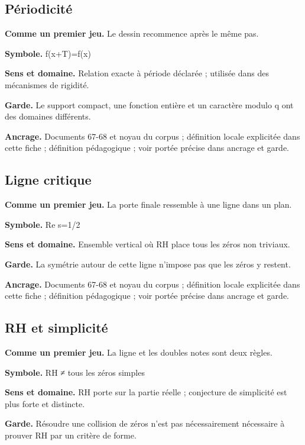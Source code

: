 \documentclass[
  9pt,
  a4paper,
]{article}
\begin{document}
\hypertarget{puxe9riodicituxe9}{%
\subsection{Périodicité}\label{puxe9riodicituxe9}}

\textbf{Comme un premier jeu.} Le dessin recommence après le même pas.

\textbf{Symbole.} f(x+T)=f(x)

\textbf{Sens et domaine.} Relation exacte à période déclarée ; utilisée
dans des mécanismes de rigidité.

\textbf{Garde.} Le support compact, une fonction entière et un caractère
modulo q ont des domaines différents.

\textbf{Ancrage.} Documents 67-68 et noyau du corpus ; définition locale
explicitée dans cette fiche ; définition pédagogique ; voir portée
précise dans ancrage et garde.

\hypertarget{ligne-critique}{%
\subsection{Ligne critique}\label{ligne-critique}}

\textbf{Comme un premier jeu.} La porte finale ressemble à une ligne
dans un plan.

\textbf{Symbole.} Re s=1/2

\textbf{Sens et domaine.} Ensemble vertical où RH place tous les zéros
non triviaux.

\textbf{Garde.} La symétrie autour de cette ligne n'impose pas que les
zéros y restent.

\textbf{Ancrage.} Documents 67-68 et noyau du corpus ; définition locale
explicitée dans cette fiche ; définition pédagogique ; voir portée
précise dans ancrage et garde.

\hypertarget{rh-et-simplicituxe9}{%
\subsection{RH et simplicité}\label{rh-et-simplicituxe9}}

\textbf{Comme un premier jeu.} La ligne et les doubles notes sont deux
règles.

\textbf{Symbole.} RH ≠ tous les zéros simples

\textbf{Sens et domaine.} RH porte sur la partie réelle ; conjecture de
simplicité est plus forte et distincte.

\textbf{Garde.} Résoudre une collision de zéros n'est pas nécessairement
nécessaire à prouver RH par un critère de forme.
\end{document}
